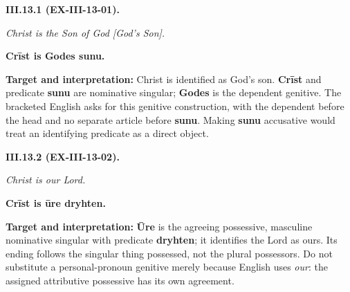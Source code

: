\par\begin{minipage}{\linewidth}\raggedright
\textbf{III.13.1 (EX-III-13-01).}

\emph{Christ is the Son of God [God’s Son].}

\textbf{Crīst is Godes sunu.}

\textbf{Target and interpretation:} Christ is identified as God's son. \textbf{Crīst} and predicate \textbf{sunu} are nominative singular; \textbf{Godes} is the dependent genitive. The bracketed English asks for this genitive construction, with the dependent before the head and no separate article before \textbf{sunu}. Making \textbf{sunu} accusative would treat an identifying predicate as a direct object.

\end{minipage}\par\addvspace{4pt}

\par\begin{minipage}{\linewidth}\raggedright
\textbf{III.13.2 (EX-III-13-02).}

\emph{Christ is our Lord.}

\textbf{Crīst is ūre dryhten.}

\textbf{Target and interpretation:} \textbf{Ūre} is the agreeing possessive, masculine nominative singular with predicate \textbf{dryhten}; it identifies the Lord as ours. Its ending follows the singular thing possessed, not the plural possessors. Do not substitute a personal-pronoun genitive merely because English uses \emph{our}: the assigned attributive possessive has its own agreement.

\end{minipage}\par\addvspace{4pt}

